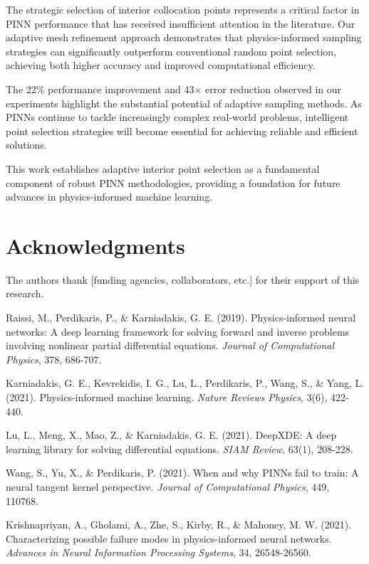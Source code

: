 \documentclass[11pt,a4paper]{article}
\begin{document}
The strategic selection of interior collocation points represents a critical factor in PINN performance that has received insufficient attention in the literature. Our adaptive mesh refinement approach demonstrates that physics-informed sampling strategies can significantly outperform conventional random point selection, achieving both higher accuracy and improved computational efficiency.

The 22\% performance improvement and 43× error reduction observed in our experiments highlight the substantial potential of adaptive sampling methods. As PINNs continue to tackle increasingly complex real-world problems, intelligent point selection strategies will become essential for achieving reliable and efficient solutions.

This work establishes adaptive interior point selection as a fundamental component of robust PINN methodologies, providing a foundation for future advances in physics-informed machine learning.

\section*{Acknowledgments}

The authors thank [funding agencies, collaborators, etc.] for their support of this research.


\begin{thebibliography}{9}

Raissi, M., Perdikaris, P., \& Karniadakis, G. E. (2019).
Physics-informed neural networks: A deep learning framework for solving forward and inverse problems involving nonlinear partial differential equations.
\textit{Journal of Computational Physics}, 378, 686-707.

Karniadakis, G. E., Kevrekidis, I. G., Lu, L., Perdikaris, P., Wang, S., \& Yang, L. (2021).
Physics-informed machine learning.
\textit{Nature Reviews Physics}, 3(6), 422-440.

Lu, L., Meng, X., Mao, Z., \& Karniadakis, G. E. (2021).
DeepXDE: A deep learning library for solving differential equations.
\textit{SIAM Review}, 63(1), 208-228.

Wang, S., Yu, X., \& Perdikaris, P. (2021).
When and why PINNs fail to train: A neural tangent kernel perspective.
\textit{Journal of Computational Physics}, 449, 110768.

Krishnapriyan, A., Gholami, A., Zhe, S., Kirby, R., \& Mahoney, M. W. (2021).
Characterizing possible failure modes in physics-informed neural networks.
\textit{Advances in Neural Information Processing Systems}, 34, 26548-26560.

\end{thebibliography}
\end{document}

